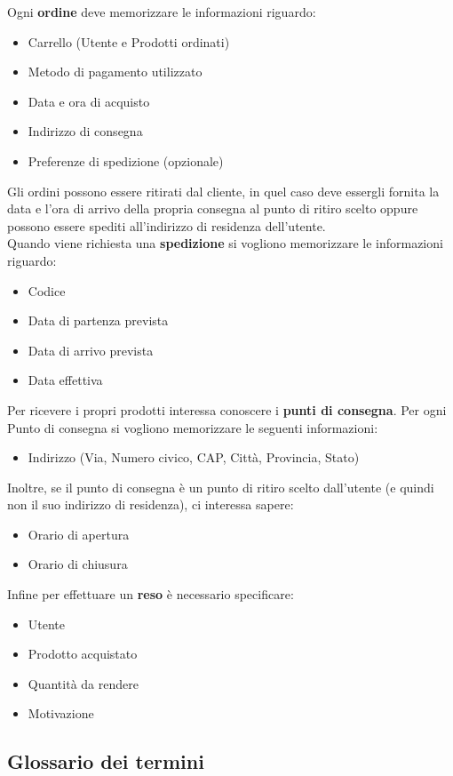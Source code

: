 \documentclass[11pt]{article}
\begin{document}
Ogni \textbf{ordine} deve memorizzare le informazioni riguardo:
\begin{itemize}
    \item Carrello (Utente e Prodotti ordinati)
    \item Metodo di pagamento utilizzato
    \item Data e ora di acquisto
    \item Indirizzo di consegna
    \item Preferenze di spedizione (opzionale)
\end{itemize}
Gli ordini possono essere ritirati dal cliente, in quel caso deve essergli fornita la data e l’ora di arrivo della propria consegna al punto di ritiro
scelto oppure possono essere spediti all'indirizzo di residenza dell'utente.\\
Quando viene richiesta una \textbf{spedizione} si vogliono memorizzare le informazioni riguardo:
\begin{itemize}
    \item Codice
    \item Data di partenza prevista
    \item Data di arrivo prevista
    \item Data effettiva
\end{itemize}
Per ricevere i propri prodotti interessa conoscere i \textbf{punti di consegna}. Per ogni Punto di consegna si vogliono
memorizzare le seguenti informazioni:
\begin{itemize}
    \item Indirizzo (Via, Numero civico, CAP, Città, Provincia, Stato)
\end{itemize}
Inoltre, se il punto di consegna è un punto di ritiro scelto dall'utente (e quindi non il suo indirizzo di residenza), ci interessa sapere:
\begin{itemize}
    \item Orario di apertura
    \item Orario di chiusura
\end{itemize}
Infine per effettuare un \textbf{reso} è necessario specificare:
\begin{itemize}
    \item Utente
    \item Prodotto acquistato
    \item Quantità da rendere
    \item Motivazione 
\end{itemize}

\subsection{Glossario dei termini}
\end{document}
